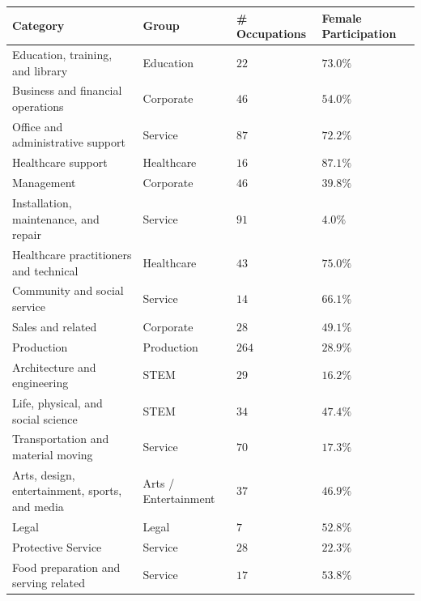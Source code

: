 \documentclass[twoside,11pt]{article}
\begin{document}
\begin{table}[H]
\centering
\begin{small}
	\centering
	\begin{tabular}{|m{3.5cm}|m{2.0cm}|m{2.5cm}|m{2.5cm}|}
	\hline	
	Category 										& Group 						& \# Occupations 	& Female Participation	\\ \hline \hline
	Education, training, and library 				& Education						& $22$ 				& $73.0\%$				\\ \hline
	Business and financial operations				& Corporate						& $46$ 				& $54.0\%$				\\ \hline
	Office and administrative support				& Service						& $87$ 				& $72.2\%$				\\ \hline
	Healthcare support 								& Healthcare					& $16$ 				& $87.1\%$				\\ \hline
	Management 										& Corporate						& $46$ 				& $39.8\%$				\\ \hline
	Installation, maintenance, and repair 			& Service						& $91$ 				& $4.0\%$ 				\\ \hline
	Healthcare practitioners and technical 			& Healthcare					& $43$ 				& $75.0\%$				\\ \hline
	Community and social service 					& Service						& $14$ 				& $66.1\%$				\\ \hline
	Sales and related 								& Corporate						& $28$ 				& $49.1\%$				\\ \hline
	Production 										& Production					& $264$ 			& $28.9\%$				\\ \hline
	Architecture and engineering 					& STEM 							& $29$ 				& $16.2\%$				\\ \hline
	Life, physical, and social science				& STEM 							& $34$ 				& $47.4\%$				\\ \hline
	Transportation and material moving				& Service						& $70$ 				& $17.3\%$				\\ \hline
	Arts, design, entertainment, sports, and media 	& Arts / Entertainment 			& $37$ 				& $46.9\%$				\\ \hline
	Legal											& Legal 						& $7$				& $52.8\%$				\\ \hline
	Protective Service 								& Service 						& $28$ 				& $22.3\%$				\\ \hline
	Food preparation and serving related 			& Service 						& $17$ 				& $53.8\%$				\\ \hline

\end{tabular}
\end{small}
\end{table}
\end{document}
